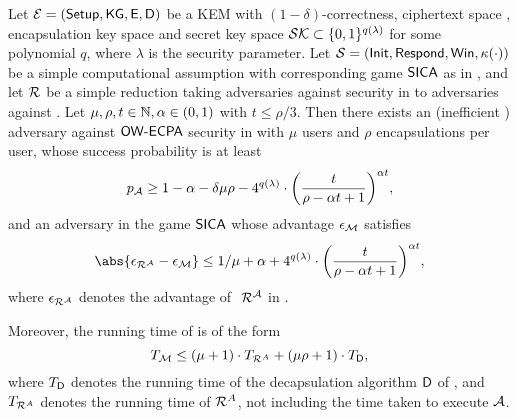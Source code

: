 \begin{theorem}\label{thm:owecpa}
  Let \(\mathcal{E} = (\mathsf{Setup}, \mathsf{KG}, \mathsf{E}, \mathsf{D})\) be a KEM
  with \((1-\delta)\)-correctness,
  ciphertext space \setC, encapsulation key space \keyspace
  and secret key space \(\mathcal{SK} \subset \{0,1\}^{q(\lambda)}\) for some polynomial \(q\),
  where \(\lambda\) is the security parameter.
  Let \(\mathcal{S} = (\mathsf{Init}, \mathsf{Respond}, \mathsf{Win},\kappa(\cdot))\) be a simple computational assumption
  with corresponding game \(\mathsf{SICA}\) as in ,
  and let \(\redR\) be a simple reduction
  taking adversaries against \OWECPA security in \KEM to adversaries against \SICA.
  Let \(\mu,\rho,t \in \mathbb{N}, \alpha \in (0,1)\) with \(t \le \rho/3\).
  Then there exists an (inefficient ) adversary \advA against \(\mathsf{OW}\text{-}\mathsf{ECPA}\) security in \KEM
  with \(\mu\) users and \(\rho\) encapsulations per user,
  whose success probability is at least
  \begin{equation}\label{ineq:A}
    p_{\advA} \ge 1 - \alpha - \delta \mu \rho
    - 4^{q(\lambda)} \cdot \left( \frac{t}{\rho - \alpha t + 1} \right)^{\alpha t},
  \end{equation}
  and an adversary \redM in the game \(\mathsf{SICA}\) whose advantage \(\epsilon_{\mathcal{M}}\) satisfies
  \begin{equation}\label{ineq:M}
    \abs{\epsilon_{\redR^{\advA}} - \epsilon_{\redM}} \le 1/\mu + \alpha
    + 4^{q(\lambda)} \cdot \left( \frac{t}{\rho - \alpha t + 1} \right)^{\alpha t},
  \end{equation}
  where \(\epsilon_{\redR^{\advA}}\) denotes the advantage of \(\text{ }\redR^{\advA}\) in \SICA.

  Moreover, the running time of \redM is of the form
  \begin{equation}\label{ineq:M:time}
    T_{\redM} \le (\mu + 1) \cdot T_{\redR^{A}} + (\mu \rho + 1) \cdot T_{\Decaps},
  \end{equation}
  where \(T_{\mathsf{D}}\) denotes the running time of the decapsulation algorithm
  \(\mathsf{D}\) of \KEM, and \(T_{\redR^{A}}\) denotes the running time of \(\redR^{A}\),
  not including the time taken to execute \(\mathcal{A}\).
\end{theorem}

